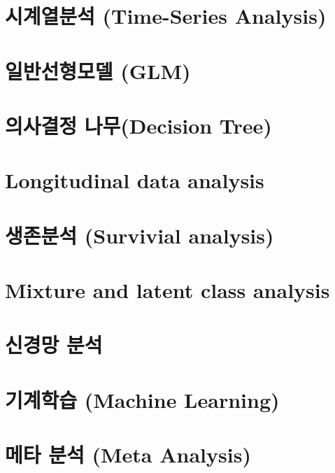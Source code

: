 \documentclass{report}
\begin{document}
\section{시계열분석 (Time-Series Analysis) }

\section{일반선형모델 (GLM)}

\section{의사결정 나무(Decision Tree)}

\section{Longitudinal data analysis}

\section{생존분석 (Survivial analysis)}

\section{Mixture and latent class analysis}

\section{신경망 분석}

\section{기계학습 (Machine Learning)}

\section{메타 분석 (Meta Analysis)}


%
%
%
\end{document}
